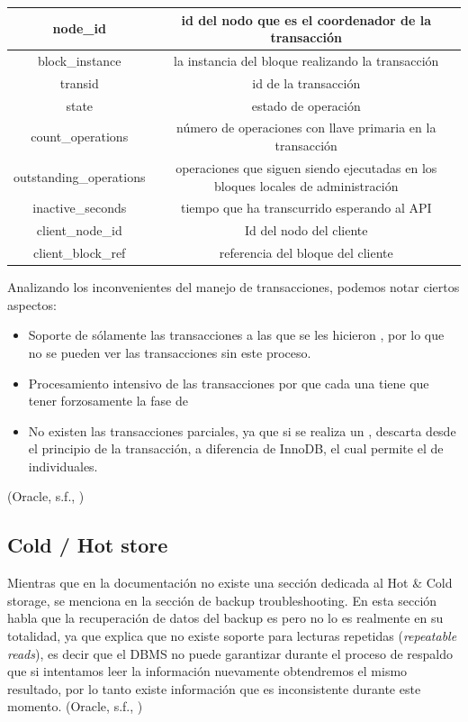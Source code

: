 \documentclass{acmart}
\begin{document}
\begin{center}
    \begin{tabular}{|c|c|}
        \hline
        node\_id & id del nodo que es el coordenador de la transacción \\
        \hline
        block\_instance & la instancia del bloque realizando la transacción \\
        \hline
        transid & id de la transacción \\
        \hline
        state & estado de operación\\
        \hline
        count\_operations & número de operaciones con llave primaria en la transacción \\
        \hline
        outstanding\_operations & operaciones que siguen siendo ejecutadas en los bloques locales de administración\\
        \hline
        inactive\_seconds & tiempo que ha transcurrido esperando al API \\
        \hline
        client\_node\_id & Id del nodo del cliente\\
        \hline
        client\_block\_ref & referencia del bloque del cliente\\
        \hline
    \end{tabular}
\end{center}

Analizando los inconvenientes del manejo de transacciones, podemos notar ciertos aspectos:
\begin{itemize}
    \item Soporte de sólamente las transacciones a las que se les hicieron , por lo que no se pueden ver las transacciones sin este proceso.
    \item Procesamiento intensivo de las transacciones por que cada una tiene que tener forzosamente la fase de 
    \item No existen las transacciones parciales, ya que si se realiza un , descarta desde el principio de la transacción, a diferencia de InnoDB, el cual permite el  de  individuales.
\end{itemize}
(Oracle, s.f., \cite{mysqllimittrans})
\subsection{Cold / Hot store}
Mientras que en la documentación no existe una sección dedicada al Hot \& Cold storage, se menciona en la sección de backup troubleshooting. En esta sección habla que la recuperación de datos del backup es  pero no lo es realmente en su totalidad, ya que explica que no existe soporte para lecturas repetidas (\textit{repeatable reads}), es decir que el DBMS no puede garantizar durante el proceso de respaldo que si intentamos leer la información nuevamente obtendremos el mismo resultado, por lo tanto existe información que es inconsistente durante este momento. (Oracle, s.f., \cite{mysqlhot})
\end{document}
